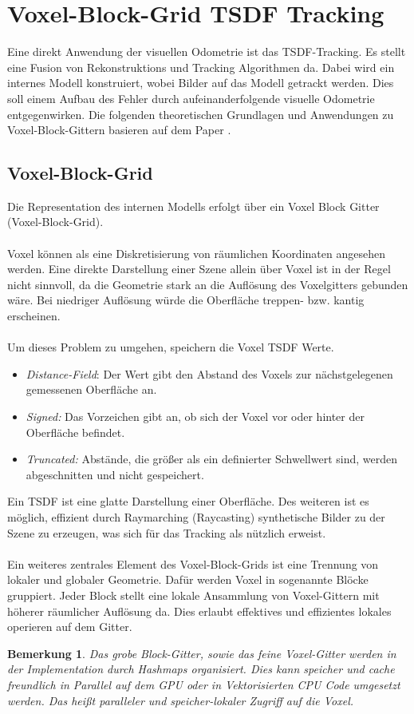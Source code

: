 \documentclass[12pt,DIV=15,BCOR=15mm,twoside,headsepline,abstract=true,listof=totoc,bibliography=totoc]{scrreprt}
\newtheorem{remark}{Bemerkung}[chapter]
\theoremstyle{remark}    %
\begin{document}
    \section{Voxel-Block-Grid TSDF Tracking}
    Eine direkt Anwendung der visuellen Odometrie ist das \ac{TSDF}-Tracking. Es stellt eine Fusion von Rekonstruktions und Tracking Algorithmen da.
    Dabei wird ein internes Modell konstruiert, wobei Bilder auf das Modell getrackt werden. Dies soll einem Aufbau des Fehler durch aufeinanderfolgende 
    visuelle Odometrie entgegenwirken. Die folgenden theoretischen Grundlagen und Anwendungen zu Voxel-Block-Gittern basieren auf dem 
    Paper \cite{dong2023ashmodernframeworkparallel,Zhou2018}.
    \subsection{Voxel-Block-Grid}
    Die Representation des internen Modells erfolgt über ein Voxel Block Gitter (Voxel-Block-Grid).\\\\
    Voxel können als eine Diskretisierung von räumlichen Koordinaten angesehen werden. Eine direkte Darstellung einer Szene allein über 
    Voxel ist in der Regel nicht sinnvoll, da die Geometrie stark an die Auflösung des Voxelgitters gebunden wäre. Bei niedriger Auflösung würde die 
    Oberfläche treppen- bzw. kantig erscheinen.\\\\
    Um dieses Problem zu umgehen, speichern die Voxel \ac{TSDF} Werte. 
    \begin{itemize}
        \item \emph{Distance-Field}: Der Wert gibt den Abstand des Voxels zur nächstgelegenen gemessenen Oberfläche an.
        \item \emph{Signed:} Das Vorzeichen gibt an, ob sich der Voxel vor oder hinter der Oberfläche befindet.
        \item \emph{Truncated:}  Abstände, die größer als ein definierter Schwellwert sind, werden abgeschnitten und nicht gespeichert.
    \end{itemize}
    Ein \ac{TSDF} ist eine glatte Darstellung einer Oberfläche. 
    Des weiteren ist es möglich, effizient durch Raymarching (Raycasting) synthetische Bilder zu der Szene zu erzeugen, was sich für das Tracking als 
    nützlich erweist.\\\\  
    Ein weiteres zentrales Element des Voxel-Block-Grids ist eine Trennung von lokaler und globaler Geometrie. Dafür werden Voxel in sogenannte Blöcke
    gruppiert. Jeder Block stellt eine lokale Ansammlung von Voxel-Gittern mit höherer räumlicher Auflösung da. Dies erlaubt effektives 
    und effizientes lokales operieren auf dem Gitter.
    \begin{remark}
    Das grobe Block-Gitter, sowie das feine Voxel-Gitter werden in der Implementation durch Hashmaps organisiert. Dies kann speicher und 
    cache freundlich in Parallel auf dem GPU oder in Vektorisierten CPU Code umgesetzt werden. Das heißt paralleler und speicher-lokaler Zugriff auf die 
    Voxel.
    \end{remark}
\end{document}
